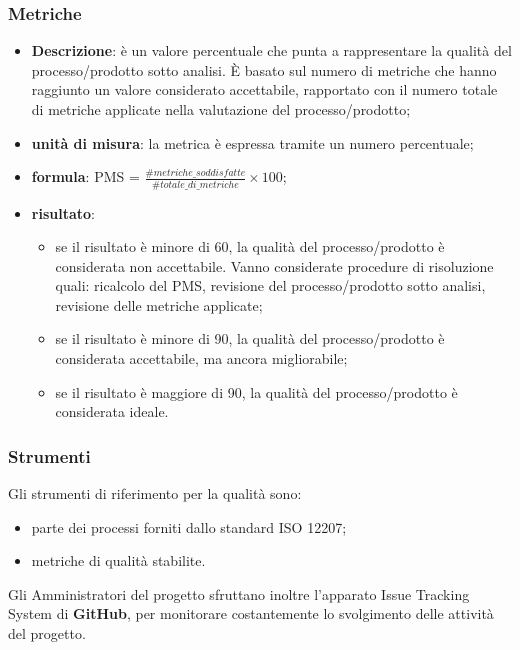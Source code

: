 	\subsubsection{Metriche}
	\begin{itemize}
		\item \textbf{Descrizione}: è un valore percentuale che punta a rappresentare la qualità del processo/prodotto sotto analisi. È basato sul numero di metriche che hanno raggiunto un valore considerato accettabile, rapportato con il numero totale di metriche applicate nella valutazione del processo/prodotto;
		\item \textbf{unità di misura}: la metrica è espressa tramite un numero percentuale;
		\item \textbf{formula}: PMS = $\displaystyle\frac{\#metriche\_soddisfatte}{\#totale\_di\_metriche}\times100$;
		\item \textbf{risultato}: 
		\begin{itemize}
			\item {se il risultato è minore di 60, la qualità del processo/prodotto è considerata non accettabile. Vanno considerate procedure di risoluzione quali:	ricalcolo del PMS, revisione del processo/prodotto sotto analisi, revisione delle metriche applicate;}
			\item {se il risultato è minore di 90, la qualità del processo/prodotto è considerata accettabile, ma ancora migliorabile;}
			\item {se il risultato è maggiore di 90, la qualità del processo/prodotto è considerata ideale.}
		\end{itemize}
	\end{itemize}	
    \subsubsection{Strumenti}
      Gli strumenti di riferimento per la qualità sono:
      \begin{itemize}
      	\item{parte dei processi forniti dallo standard ISO 12207;}
      	\item{metriche di qualità stabilite.}
      \end{itemize}
  	  Gli Amministratori del progetto sfruttano inoltre l'apparato Issue Tracking System di \textbf{\mbox{GitHub}}, per monitorare costantemente lo svolgimento delle attività del progetto.

